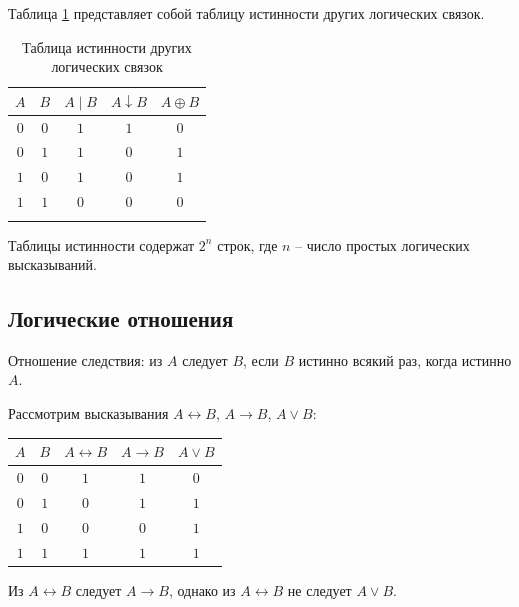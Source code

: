 Таблица \ref{tab:truth-table-olc} представляет собой таблицу истинности других логических связок.

{
\renewcommand*{\arraystretch}{1.5}
\begin{longtable}{|c|c|c|c|c|}
    \hline
    \(A\) & \(B\) & \(A \mathop{|} B\) & \(A \downarrow B\) & \(A \oplus B\) \\
    \hline
    \(0\) & \(0\) & \(1\)              & \(1\)              & \(0\)          \\
    \hline
    \(0\) & \(1\) & \(1\)              & \(0\)              & \(1\)          \\
    \hline
    \(1\) & \(0\) & \(1\)              & \(0\)              & \(1\)          \\
    \hline
    \(1\) & \(1\) & \(0\)              & \(0\)              & \(0\)          \\
    \hline
    \caption{Таблица истинности других логических связок}
    \label{tab:truth-table-olc}
\end{longtable}
}

\begin{note*}
    Таблицы истинности содержат \(2^n\) строк, где \(n\) -- число простых логических высказываний.
\end{note*}

\subsection{Логические отношения}

Отношение следствия: из \(A\) следует \(B\), если \(B\) истинно всякий раз, когда истинно \(A\).

\begin{example*}
    Рассмотрим высказывания \(A \leftrightarrow B\), \(A \to B\), \(A \lor B\):
    {
    \renewcommand*{\arraystretch}{1.5}
    \begin{longtable}{|c|c|c|c|c|}
        \hline
        \(A\) & \(B\) & \(A \leftrightarrow B\) & \(A \to B\) & \(A \lor B\) \\
        \hline
        \(0\) & \(0\) & \(1\)                   & \(1\)       & \(0\)        \\
        \hline
        \(0\) & \(1\) & \(0\)                   & \(1\)       & \(1\)        \\
        \hline
        \(1\) & \(0\) & \(0\)                   & \(0\)       & \(1\)        \\
        \hline
        \(1\) & \(1\) & \(1\)                   & \(1\)       & \(1\)        \\
        \hline
    \end{longtable}
    }
    Из \(A \leftrightarrow B\) следует \(A \to B\), однако из \(A \leftrightarrow B\) не следует \(A \lor B\).
\end{example*}

